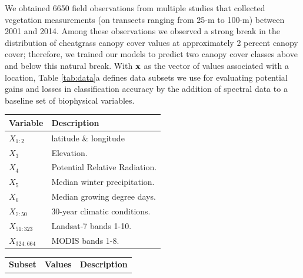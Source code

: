 \documentclass{article} %
\begin{document}
We obtained 6650 field observations  from multiple studies that collected vegetation measurements (on transects ranging from 25-m to 100-m) between 2001 and 2014.  Among these observations we observed a
strong break in the distribution of cheatgrass canopy cover values at approximately 2 percent canopy
cover; 
therefore, we trained our models to predict two canopy cover classes
above and below this natural break.  With ${\bf x}$ as the vector of values associated with a location, Table \ref{tab:data}a defines data subsets we use for evaluating potential gains and losses in classification accuracy by the addition of spectral data to a baseline set of biophysical variables. 
\begin{table}
\centering
\begin{minipage}{.48\textwidth}
  \centering
 \begin{tabularx}{\textwidth}{l l}
{\bf Variable} &{\bf Description}\\%
\midrule
$X_{1:2}$ & latitude \& longitude \\%
$X_3$ & Elevation.\\%
$X_4$ & Potential Relative Radiation.\\%
$X_5$ & Median winter precipitation.\\%
$X_6$ & Median growing degree days.\\%
$X_{7:50}$ & 30-year climatic conditions.\\%
$X_{51:323}$ & Landsat-7 bands 1-10.\\%
$X_{324:664}$ & MODIS bands 1-8.\\%
\end{tabularx}
\end{minipage}%
\begin{minipage}{.04\textwidth}
\end{minipage}
\begin{minipage}{.48\textwidth}
  \centering
 \begin{tabularx}{\textwidth}{l |l| l}
{\bf Subset} &{\bf Values} &{\bf Description}\\

\end{tabularx}
\end{minipage}
\end{table}
\end{document}
